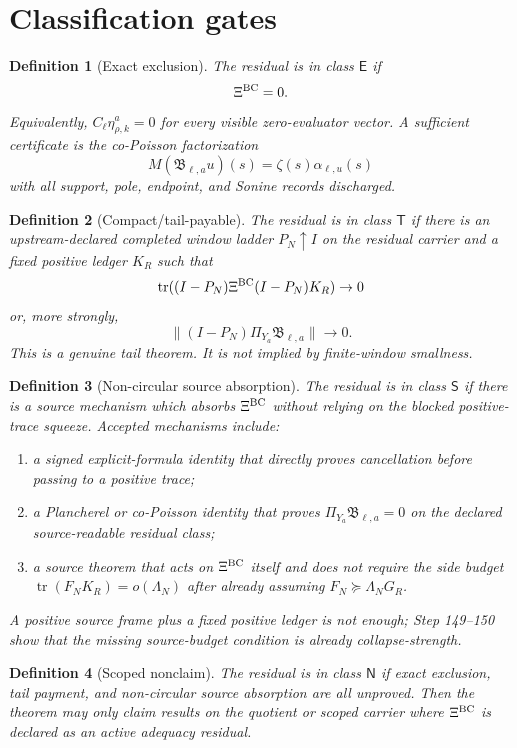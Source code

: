 \documentclass[11pt]{article}
\newtheorem{definition}{Definition}
\newcommand{\tr}{\operatorname{tr}}
\newcommand{\XiBC}{\Xi^{\rm BC}}
\newcommand{\Ya}{Y_a}
\newcommand{\Bell}{\mathfrak B_{\ell,a}}
\newcommand{\Cell}{C_\ell}
\begin{document}
\section{Classification gates}

\begin{definition}[Exact exclusion]
The residual is in class $\mathsf E$ if
\[
  \XiBC=0.
\]
Equivalently, $\Cell\eta^a_{\rho,k}=0$ for every visible zero-evaluator vector.  A sufficient certificate is the co-Poisson factorization
\[
  M(\Bell u)(s)=\zeta(s)\alpha_{\ell,u}(s)
\]
with all support, pole, endpoint, and Sonine records discharged.
\end{definition}

\begin{definition}[Compact/tail-payable]
The residual is in class $\mathsf T$ if there is an upstream-declared completed window ladder $P_N\uparrow I$ on the residual carrier and a fixed positive ledger $K_R$ such that
\[
  \tr((I-P_N)\XiBC(I-P_N)K_R)\to0
\]
or, more strongly,
\[
  \|(I-P_N)\Pi_{\Ya}\Bell\|\to0.
\]
This is a genuine tail theorem.  It is not implied by finite-window smallness.
\end{definition}

\begin{definition}[Non-circular source absorption]
The residual is in class $\mathsf S$ if there is a source mechanism which absorbs $\XiBC$ without relying on the blocked positive-trace squeeze.  Accepted mechanisms include:
\begin{enumerate}[label=(\roman*)]
  \item a signed explicit-formula identity that directly proves cancellation before passing to a positive trace;
  \item a Plancherel or co-Poisson identity that proves $\Pi_{\Ya}\Bell=0$ on the declared source-readable residual class;
  \item a source theorem that acts on $\XiBC$ itself and does not require the side budget
  $\tr(F_NK_R)=o(\Lambda_N)$ after already assuming $F_N\succeq\Lambda_NG_R$.
\end{enumerate}
A positive source frame plus a fixed positive ledger is not enough; Step 149--150 show that the missing source-budget condition is already collapse-strength.
\end{definition}

\begin{definition}[Scoped nonclaim]
The residual is in class $\mathsf N$ if exact exclusion, tail payment, and non-circular source absorption are all unproved.  Then the theorem may only claim results on the quotient or scoped carrier where $\XiBC$ is declared as an active adequacy residual.
\end{definition}
\end{document}
